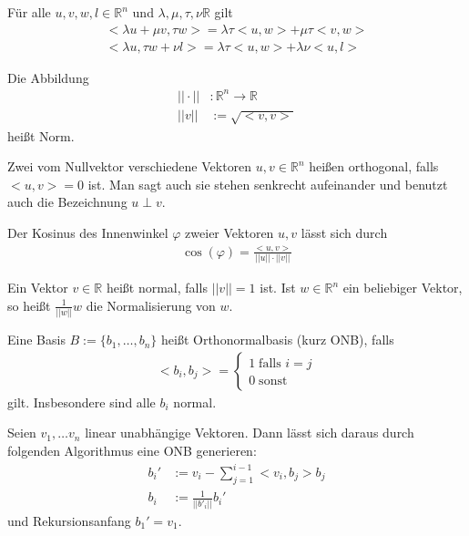 \begin{Satz}
Für alle $u,v,w,l \in \mathbb{R}^n$ und $\lambda, \mu, \tau, \nu \mathbb{R}$ gilt
\begin{align*}
<\lambda u + \mu v, \tau w> = \lambda \tau<u,w> + \mu \tau <v,w> \\
<\lambda u , \tau w + \nu l> = \lambda \tau<u,w> + \lambda \nu <u,l>
\end{align*}
\end{Satz}
\begin{Definition}
Die Abbildung 
\begin{align*}
|| \cdot || &: \mathbb{R}^n  \to \mathbb{R} \\
||v||  &:= \sqrt{<v,v>} 
\end{align*}  
heißt Norm.
\end{Definition}

\begin{Definition}
Zwei vom Nullvektor verschiedene Vektoren $u,v \in \mathbb{R}^n$ heißen orthogonal, falls $<u,v> = 0$ ist. 
Man sagt auch sie stehen senkrecht aufeinander und benutzt auch die Bezeichnung $u \perp v$. 
\end{Definition}


\begin{Satz}
Der Kosinus des Innenwinkel $\varphi$ zweier Vektoren $u,v$ lässt sich durch 
\begin{align*}
\cos(\varphi) = \frac{<u,v>}{||u|| \cdot ||v||}
\end{align*}
\end{Satz}

\begin{Definition}
Ein Vektor $v \in \mathbb{R}$ heißt normal, falls $||v|| = 1$ ist.
Ist $w \in \mathbb{R}^n$ ein beliebiger Vektor, so heißt $\frac{1}{||w||} w$ die Normalisierung von $w$.
\end{Definition}

\begin{Definition}
Eine Basis  $B:= \{ b_1, \hdots , b_n \}$ heißt Orthonormalbasis (kurz ONB), falls 
\begin{align*}
<b_i, b_j> = \begin{cases}  1 \; \text{falls }  i = j  \\ 0 \; \text{sonst}\end{cases}
\end{align*}
gilt. Insbesondere sind alle $b_i$ normal.
\end{Definition}

\begin{Algorithmus}
Seien  $v_1, \hdots v_n$ linear unabhängige Vektoren.  Dann lässt sich daraus durch folgenden Algorithmus 
eine ONB generieren: 
\begin {align*}
b_i ' & := v_i - \sum_{j=1}^{i-1} <v_i, b_j> b_j \\
b_i  & :=  \frac{1}{||b'_i||} b_i'
\end{align*}
und Rekursionsanfang $b_1' = v_1$.
\end{Algorithmus}


